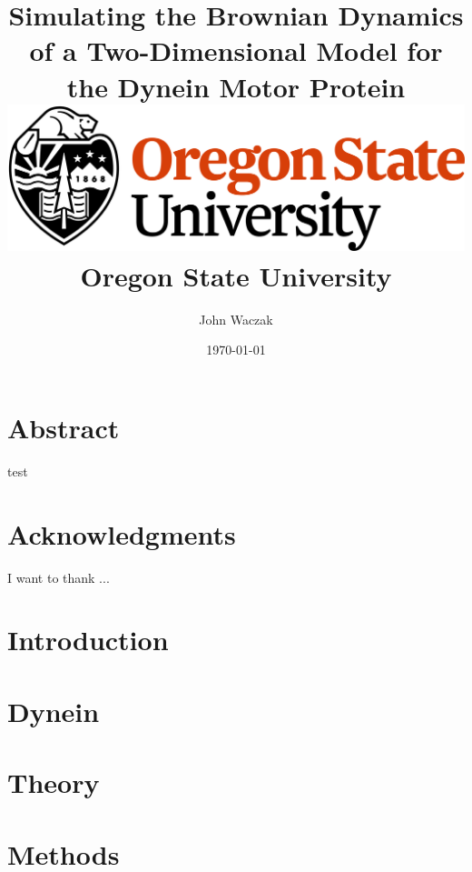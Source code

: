 \documentclass[12pt]{report}
\title{
	{Simulating the Brownian Dynamics of a Two-Dimensional Model for the Dynein Motor Protein}\vspace{1.5em}\\
	\includegraphics[width=0.5\columnwidth]{OSU_logo.png}\vspace{0.5em}\\
	\large{Oregon State University}
}
\author{John Waczak}
\date{\today}
\begin{document}
	\maketitle
	
	\chapter*{Abstract}
	test
	\chapter*{Acknowledgments}
	I want to thank ...
	
	\tableofcontents
	
	\chapter{Introduction}
	
	\chapter{Dynein}
	
	\chapter{Theory}
	
	\chapter{Methods}
	
	


\end{document}
